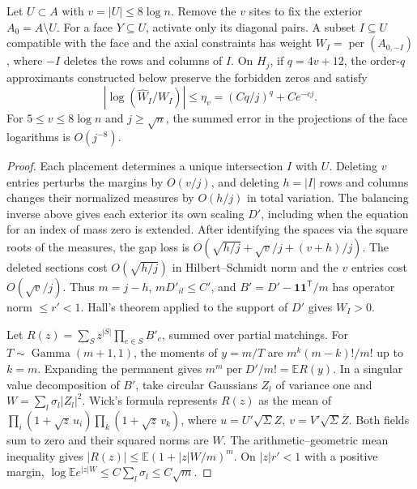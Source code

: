 \begin{proposicion}\label{prop:menores-llegada}
Let \(U\subset A\) with \(v=|U|\le8\log n\). Remove the \(v\) sites to fix the exterior \(A_0=A\setminus
U\). For a face \(Y\subseteq U\), activate only its diagonal pairs. A subset \(I\subseteq U\) compatible
with the face and the axial constraints has weight \(W_I=\operatorname{per}(A_{0,-I})\), where \(-I\)
deletes the rows and columns of \(I\). On \(H_j\), if \(q=4v+12\), the order-\(q\) approximants
constructed below preserve the forbidden zeros and satisfy
\[
 |\log(\widehat W_I/W_I)|\le\eta_v=(Cq/j)^q+Ce^{-cj}.
\]
For \(5\le v\le8\log n\) and \(j\ge\sqrt n\), the summed error in the projections of the face logarithms
is \(O(j^{-8})\).
\end{proposicion}
\begin{proof}
Each placement determines a unique intersection \(I\) with \(U\). Deleting \(v\) entries perturbs the
margins by \(O(v/j)\), and deleting \(h=|I|\) rows and columns changes their normalized measures by
\(O(h/j)\) in total variation. The balancing inverse above gives each exterior its own scaling \(D'\),
including when the equation for an index of mass zero is extended. After identifying the spaces via the
square roots of the measures, the gap loss is \(O(\sqrt{h/j}+\sqrt v/j+(v+h)/j)\). The deleted sections
cost \(O(\sqrt{h/j})\) in Hilbert--Schmidt norm and the \(v\) entries cost \(O(\sqrt v/j)\). Thus
\(m=j-h\), \(mD'_{il}\le C'\), and \(B'=D'-\mathbf1\mathbf1^{\mathsf T}/m\) has operator norm \(\le
r'<1\). Hall's theorem applied to the support of \(D'\) gives \(W_I>0\).

Let \(R(z)=\sum_S z^{|S|}\prod_{e\in S}B'_e\), summed over partial matchings. For
\(T\sim\operatorname{Gamma}(m+1,1)\), the moments of \(y=m/T\) are \(m^k(m-k)!/m!\) up to \(k=m\).
Expanding the permanent gives \(m^m\operatorname{per}D'/m!=\mathbb E R(y)\). In a singular value
decomposition of \(B'\), take circular Gaussians \(Z_l\) of variance one and \(W=\sum_l\sigma_l|Z_l|^2\).
Wick's formula represents \(R(z)\) as the mean of \(\prod_i(1+\sqrt z\,u_i)\prod_k(1+\sqrt z\,v_k)\),
where \(u=U'\sqrt\Sigma Z,\ v=V'\sqrt\Sigma\overline Z\). Both fields sum to zero and their squared norms
are \(W\). The arithmetic--geometric mean inequality gives \(|R(z)|\le\mathbb E(1+|z|W/m)^m\). On
\(|z|r'<1\) with a positive margin, \(\log\mathbb E e^{|z|W}\le C\sum_l\sigma_l\le C\sqrt m\).


\end{proof}
